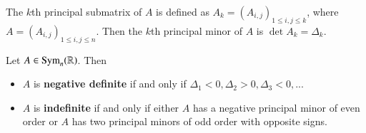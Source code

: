 The $k$th principal submatrix of $A$ is defined as $A_k = (A_{i,j})_{1\leq i,j\leq k}$, where $A = (A_{i,j})_{1\leq i,j\leq n}$. Then the $k$th principal minor of $A$ is $\det A_k = \Delta_k$.

\begin{corollary}
    Let $A \in \text{Sym}_n(\mathbb R)$. Then \begin{itemize}
        \item $A$ is \textbf{negative definite} if and only if $\Delta_1 < 0,\Delta_2 > 0, \Delta_3 < 0,...$
        \item $A$ is \textbf{indefinite} if and only if either $A$ has a negative principal minor of even order or $A$ has two principal minors of odd order with opposite signs.
    \end{itemize}
\end{corollary}

